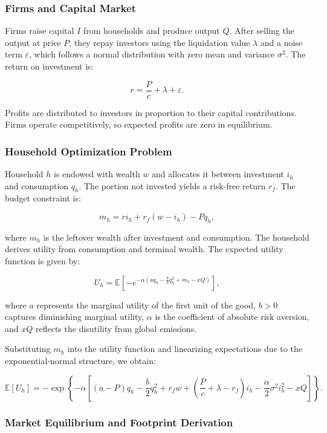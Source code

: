 \documentclass[12pt,a4paper]{article}%
\begin{document}
\subsubsection{Firms and Capital Market}

Firms raise capital $I$ from households and produce output $Q$. After selling the output at price $P$, they repay investors using the liquidation value $\lambda$ and a noise term $\varepsilon$, which follows a normal distribution with zero mean and variance $\sigma^2$. The return on investment is:

\[
r = \frac{P}{c} + \lambda + \varepsilon.
\]

Profits are distributed to investors in proportion to their capital contributions. Firms operate competitively, so expected profits are zero in equilibrium.

\subsubsection{Household Optimization Problem}

Household $h$ is endowed with wealth $w$ and allocates it between investment $i_h$ and consumption $q_h$. The portion not invested yields a risk-free return $r_f$. The budget constraint is:

\[
m_h = r i_h + r_f(w - i_h) - P q_h,
\]

where $m_h$ is the leftover wealth after investment and consumption. The household derives utility from consumption and terminal wealth. The expected utility function is given by:

\[
U_h = \mathbb{E} \left[ -e^{-\alpha \left( a q_h - \frac{b}{2}q_h^2 + m_h - xQ \right)} \right],
\]

where $a$ represents the marginal utility of the first unit of the good, $b > 0$ captures diminishing marginal utility, $\alpha$ is the coefficient of absolute risk aversion, and $xQ$ reflects the disutility from global emissions.

Substituting $m_h$ into the utility function and linearizing expectations due to the exponential-normal structure, we obtain:

\[
\mathbb{E}[U_h] = -\exp \left\{ -\alpha \left[ (a - P)q_h - \frac{b}{2}q_h^2 + r_f w + \left( \frac{P}{c} + \lambda - r_f \right)i_h - \frac{\alpha}{2} \sigma^2 i_h^2 - xQ \right] \right\}.
\]

\subsubsection{Market Equilibrium and Footprint Derivation}
\end{document}
